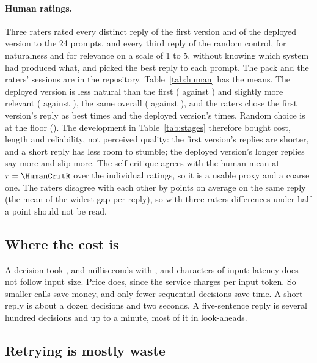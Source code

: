 \documentclass[10pt,twocolumn]{article}
\begin{document}
\paragraph{Human ratings.} Three raters rated every distinct reply of the first version and of the
deployed version to the 24 prompts, and
every third reply of the random control, for naturalness and for relevance on a scale of 1 to 5,
without knowing which system had produced what, and picked the best reply to each prompt. The pack
and the raters' sessions are in the repository. Table~\ref{tab:human} has the means. The deployed
version is less natural than the first (\HumanDepNat{} against \HumanBaseNat{}) and slightly more
relevant (\HumanDepRel{} against \HumanBaseRel{}), the same overall (\HumanDepMean{} against
\HumanBaseMean{}), and the raters chose the first version's reply as best \PrefBase{} times and the
deployed version's \PrefDep{} times. Random choice is at the floor (\HumanRandMean{}). The development in
Table~\ref{tab:stages} therefore bought cost, length and reliability, not perceived quality: the
first version's replies are shorter, and a short reply has less room to stumble; the deployed
version's longer replies say more and slip more. The self-critique agrees with the human mean at
$r = \HumanCritR$ over the individual ratings, so it is a usable proxy and a coarse one. The raters
disagree with each other by \HumanSpread{} points on average on the same reply (the mean of the
widest gap per reply), so with three raters differences under half a point should not be read.

\subsection{Where the cost is}\label{sec:cost}

A decision took \WinFullMs{}, \WinEightMs{} and \WinThreeMs{} milliseconds with \WinFullChars{},
\WinEightChars{} and \WinThreeChars{} characters of input: latency does not follow input size.
Price does, since the service charges per input token. So smaller calls save money, and only fewer
sequential decisions save time. A short reply is about a dozen decisions and two seconds. A
five-sentence reply is several hundred decisions and up to a minute, most of it in look-aheads.

\subsection{Retrying is mostly waste}
\end{document}

